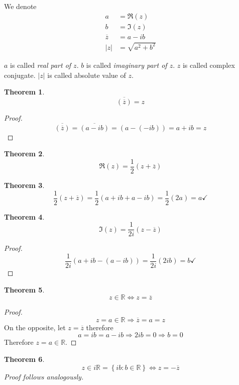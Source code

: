 \documentclass[a4paper,landscape,twocolumn]{article}
\newtheorem{theorem}{Theorem}
\newcommand\set[1]{\left\{#1\right\}}
\newcommand\abs[1]{\left|#1\right|}
\begin{document}
We denote
\begin{align*}
  a &= \Re(z) \\
  b &= \Im(z) \\
  \overline{z} &= a - ib \\
  \abs{z} &= \sqrt{a^2 + b^2}
\end{align*}

$a$ is called \emph{real part of $z$}. $b$ is called \emph{imaginary part of $z$}.
$z$ is called complex conjugate. $\abs{z}$ is called absolute value of $z$.

\begin{theorem}
  \[  \overline{(\overline{z})} = z  \]
\end{theorem}

\begin{proof}
  \[ \overline{(\overline{z})} = \overline{(a - ib)} = (a - (-ib)) = a + ib  = z \]
\end{proof}

\begin{theorem}
  \[ \Re(z) = \frac12 (z + \overline z) \]
\end{theorem}

\begin{theorem}
  \[ \frac12(z + \overline{z}) = \frac12(a + ib + a - ib) = \frac12 (2a) = a \checkmark \]
\end{theorem}

\begin{theorem}
  \[ \Im(z) = \frac{1}{2i} (z - \overline{z}) \]
\end{theorem}

\begin{proof}
  \[ \frac{1}{2i} (a + ib - (a - ib)) = \frac{1}{2i} (2ib) = b \checkmark \]
\end{proof}

\begin{theorem}
  \[ z \in \mathbb R \Leftrightarrow z = \overline{z} \]
\end{theorem}
\begin{proof}
  \[ z = a \in \mathbb R \Rightarrow \overline{z} = a = z \]
  On the opposite, let $z = \overline{z}$ therefore
  \[ a = ib = a - ib \Rightarrow 2ib = 0 \Rightarrow b = 0 \]
  Therefore $z = a \in \mathbb R$.
\end{proof}

\begin{theorem}
  \[ z \in i \mathbb R = \set{ib : b \in \mathbb R} \Leftrightarrow z = -\overline{z} \]
  Proof follows analogously.
\end{theorem}
\end{document}
